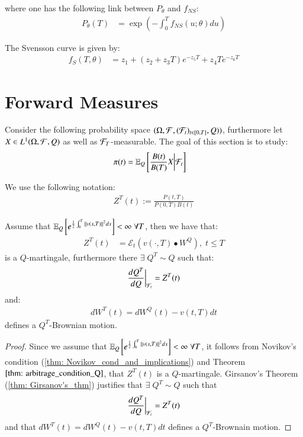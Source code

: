where one has the following link between $P_{\theta}$ and $f_{NS}$: 
\begin{align*}
P_{\theta}(T) &= \exp\left(
-\int_{0}^{T}f_{NS}(u;\theta)du
\right)    
\end{align*}

The Svensson curve is given by: 
\begin{align*}
f_{S}(T, \theta) &= 
z_{1} + (z_{2}+z_{3}T)e^{-z_{5}T} + z_{4}Te^{-z_{6}T}
\end{align*}






\newpage 
\section{Forward Measures}
Consider the following probability space $(\Omega, \mathcal{F}, (\mathcal{F}_{t})_{t \in [0,T]}, Q))$, furthermore let \\ 
$X\in L^{1}(\Omega, \mathcal{F}, Q)$ as well as $\mathcal{F}_{T}$-measurable. The goal of this section is to study: 
\begin{align*}
\pi(t) &= \mathbb{E}_{Q}\left[
\frac{B(t)}{B(T)}X\bigg{|}\mathcal{F}_{t}
\right]    
\end{align*}

\begin{notation}
We use the following notation: 
\begin{align*}
Z^{T}(t) := \frac{P(t,T)}{P(0,T)B(t)}    
\end{align*}
\end{notation}

\begin{proposition}
\label{prop: Z(T)(t)_Q_martingale}
Assume that $\mathbb{E}_{Q}\left[e^{\frac{1}{2}\int_{0}^{T}\norm{v(s,T)}^{2}ds}\right] < \infty \; \forall T$, then we have that: 
\begin{align*}
Z^{T}(t) 
&= \mathcal{E}_{t}(v(\cdot, T)\bullet W^{Q}), \; t\leq T
\end{align*}
is a $Q$-martingale, furthermore there $\exists\; Q^{T}\sim Q$ such that:
\begin{align*}
\frac{dQ^{T}}{dQ}\bigg{|}_{\mathcal{F}_{t}} = Z^{T}(t)    
\end{align*}
and: 
\begin{align*}
dW^{T}(t) = dW^{Q}(t) - v(t,T)dt    
\end{align*}
defines a $Q^{T}$-Brownian motion. 
\end{proposition}

\begin{proof}
Since we assume that $\mathbb{E}_{Q}\left[e^{\frac{1}{2}\int_{0}^{T}\norm{v(s,T)}^{2}ds}\right] < \infty \; \forall T$, it follows from Novikov's condition (\ref{thm: Novikov_cond_and_implications}) and Theorem $\ref{thm: arbitrage_condition_Q}$, that $Z^{T}(t)$ is a $Q$-martingale. Girsanov's Theorem (\ref{thm: Girsanov's_thm}) justifies that  $\exists\; Q^{T}\sim Q$ such that 
$$
\frac{dQ^{T}}{dQ}\bigg{|}_{\mathcal{F}_{t}} = Z^{T}(t)
$$
and that $dW^{T}(t) = dW^{Q}(t) - v(t,T)dt$ defines a $Q^{T}$-Brownain motion. 
\end{proof}


